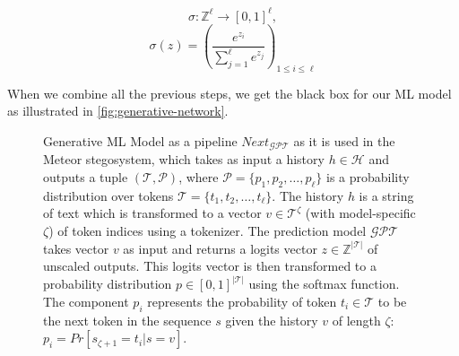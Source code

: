 $$\sigma \colon \mathbb{Z}^{\ell} \rightarrow [0,1]^{\ell},$$
$$\sigma(z) = \left(\frac{e^{z_i}}{\sum_{j=1}^{\ell} e^{z_j}}\right)_{1 \leq i \leq \ell}$$

When we combine all the previous steps, we get the black box for our ML model as illustrated in \autoref{fig:generative-network}.

\begin{figure}[htpb]
	\centering
	\caption{
Generative ML Model as a pipeline $Next_{\mathcal{GPT}}$ as it is used in the Meteor stegosystem, which takes as input a history $h \in \mathcal{H}$ and outputs a tuple $(\mathcal{T}, \mathcal{P})$, where $\mathcal{P} = \{p_1, p_2, \dots, p_\ell\}$ is a probability distribution over tokens $\mathcal{T} = \{ t_1, t_2, \dots, t_\ell\}$. 
The history $h$ is a string of text which is transformed to a vector $v \in \mathcal{T}^\zeta$ (with model-specific $\zeta$) of token indices using a tokenizer.
The prediction model $\mathcal{GPT}$ takes vector $v$ as input and returns a logits vector $z \in \mathbb{Z}^{|\mathcal{T}|}$ of unscaled outputs.
This logits vector is then transformed to a probability distribution $p \in [0,1]^{|\mathcal{T}|}$ using the softmax function.
	The component $p_i$ represents the probability of token $t_i \in \mathcal{T}$ to be the next token in the sequence $s$ given the history $v$ of length $\zeta$: $p_i = Pr[s_{\zeta+1}=t_i|s=v]$.
}
	\label{fig:generative-network}
\end{figure}

